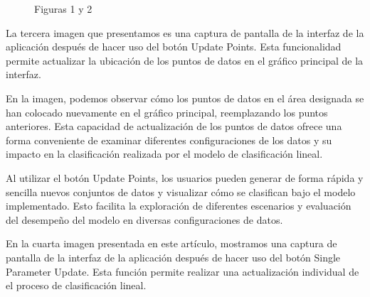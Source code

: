 \documentclass[twoside,10pt]{article}
\numberwithin{equation}{section}
\begin{document}
\begin{figure}[ht]
    \centering
    \hspace{1cm}
    \caption{Figuras 1 y 2}
\end{figure}

La tercera imagen que presentamos es una captura de pantalla de la interfaz de la aplicación después de hacer uso del botón Update Points. Esta funcionalidad permite actualizar la ubicación de los puntos de datos en el gráfico principal de la interfaz.

En la imagen, podemos observar cómo los puntos de datos en el área designada se han colocado nuevamente en el gráfico principal, reemplazando los puntos anteriores. Esta capacidad de actualización de los puntos de datos ofrece una forma conveniente de examinar diferentes configuraciones de los datos y su impacto en la clasificación realizada por el modelo de clasificación lineal.

Al utilizar el botón Update Points, los usuarios pueden generar de forma rápida y sencilla nuevos conjuntos de datos y visualizar cómo se clasifican bajo el modelo implementado. Esto facilita la exploración de diferentes escenarios y evaluación del desempeño del modelo en diversas configuraciones de datos.



En la cuarta imagen presentada en este artículo, mostramos una captura de pantalla de la interfaz de la aplicación después de hacer uso del botón Single Parameter Update. Esta función permite realizar una actualización individual de el proceso de clasificación lineal.
\end{document}
